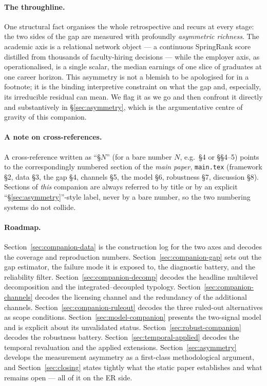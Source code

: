 \documentclass[11pt]{article}
\begin{document}
\paragraph{The throughline.} One structural fact organises the whole retrospective and recurs at every stage:
the two sides of the gap are measured with profoundly \emph{asymmetric richness}. The academic axis is a
relational network object --- a continuous SpringRank score distilled from thousands of faculty-hiring
decisions --- while the employer axis, as operationalised, is a single scalar, the median earnings of one
slice of graduates at one career horizon. This asymmetry is not a blemish to be apologised for in a footnote;
it is the binding interpretive constraint on what the gap and, especially, its irreducible residual can mean.
We flag it as we go and then confront it directly and substantively in \S\ref{sec:asymmetry}, which is the
argumentative centre of gravity of this companion.

\paragraph{A note on cross-references.} A cross-reference written as ``\S$N$'' (for a bare number $N$, e.g.\
\S4 or \S\S4--5) points to the correspondingly numbered section of the \emph{main paper}, \texttt{main.tex}
(framework \S2, data \S3, the gap \S4, channels \S5, the model \S6, robustness \S7, discussion \S8). Sections of
\emph{this} companion are always referred to by title or by an explicit ``\S\ref{sec:asymmetry}''-style label,
never by a bare number, so the two numbering systems do not collide.

\paragraph{Roadmap.} Section~\ref{sec:companion-data} is the construction log for the two axes and decodes the
coverage and reproduction numbers. Section~\ref{sec:companion-gap} sets out the gap estimator, the failure mode
it is exposed to, the diagnostic battery, and the reliability filter. Section~\ref{sec:companion-decomp} decodes
the headline multilevel decomposition and the integrated--decoupled typology.
Section~\ref{sec:companion-channels} decodes the licensing channel and the redundancy of the additional
channels. Section~\ref{sec:companion-ruleout} decodes the three ruled-out alternatives as scope conditions.
Section~\ref{sec:model-companion} presents the two-signal model and is explicit about its unvalidated status.
Section~\ref{sec:robust-companion} decodes the robustness battery. Section~\ref{sec:temporal-applied} decodes the
temporal revaluation and the applied extensions. Section~\ref{sec:asymmetry} develops the measurement asymmetry
as a first-class methodological argument, and Section~\ref{sec:closing} states tightly what the static paper
establishes and what remains open --- all of it on the ER side.
\end{document}
